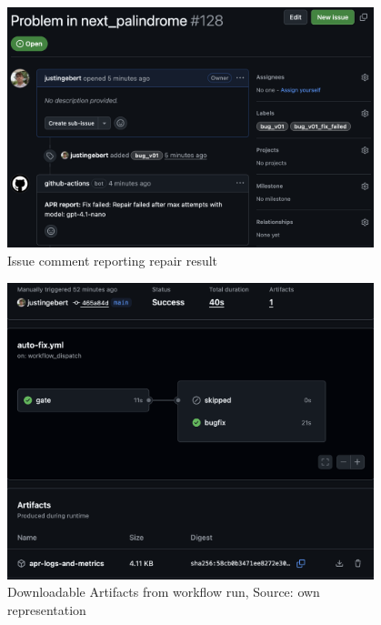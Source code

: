 \begin{figure}[H]
    \centering
    \includegraphics[width=0.95\textwidth]{images/verification/comment.png}
    \caption{Issue comment reporting repair result}
    \label{fig:comment}
\end{figure}

\begin{figure}[H]
    \centering
    \includegraphics[width=0.95\textwidth]{images/verification/artifacts.png}
    \caption{Downloadable Artifacts from workflow run, Source: own representation}
    \label{fig:logs-artifacts}
\end{figure}

